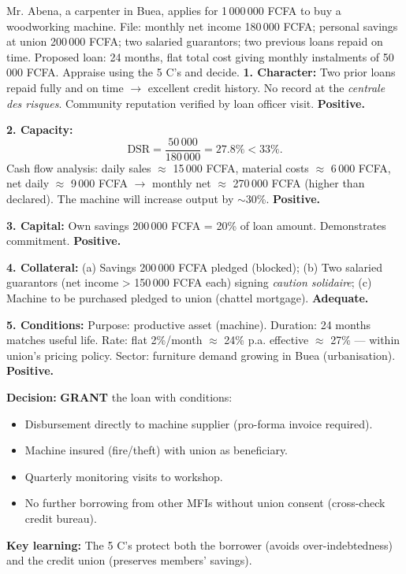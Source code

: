 \documentclass[11pt]{article}
\begin{document}
\begin{exoresolu}
Mr. Abena, a carpenter in Buea, applies for 1\,000\,000 FCFA to buy a woodworking machine. File: monthly net income 180\,000 FCFA; personal savings at union 200\,000 FCFA; two salaried guarantors; two previous loans repaid on time. Proposed loan: 24 months, flat total cost giving monthly instalments of 50\,000 FCFA. Appraise using the 5 C's and decide.
\tcblower
\textbf{1. Character:} Two prior loans repaid fully and on time $\rightarrow$ excellent credit history. No record at the \emph{centrale des risques}. Community reputation verified by loan officer visit. \textbf{Positive.}

\textbf{2. Capacity:}
\[
\text{DSR} = \frac{50\,000}{180\,000} = 27.8\% < 33\%.
\]
Cash flow analysis: daily sales $\approx$ 15\,000 FCFA, material costs $\approx$ 6\,000 FCFA, net daily $\approx$ 9\,000 FCFA $\rightarrow$ monthly net $\approx$ 270\,000 FCFA (higher than declared). The machine will increase output by $\sim$30\%. \textbf{Positive.}

\textbf{3. Capital:} Own savings 200\,000 FCFA = 20\% of loan amount. Demonstrates commitment. \textbf{Positive.}

\textbf{4. Collateral:} (a) Savings 200\,000 FCFA pledged (blocked); (b) Two salaried guarantors (net income > 150\,000 FCFA each) signing \emph{caution solidaire}; (c) Machine to be purchased pledged to union (chattel mortgage). \textbf{Adequate.}

\textbf{5. Conditions:} Purpose: productive asset (machine). Duration: 24 months matches useful life. Rate: flat 2\%/month $\approx$ 24\% p.a. effective $\approx$ 27\% — within union's pricing policy. Sector: furniture demand growing in Buea (urbanisation). \textbf{Positive.}

\textbf{Decision:} \textbf{GRANT} the loan with conditions:
\begin{itemize}
\item Disbursement directly to machine supplier (pro-forma invoice required).
\item Machine insured (fire/theft) with union as beneficiary.
\item Quarterly monitoring visits to workshop.
\item No further borrowing from other MFIs without union consent (cross-check credit bureau).
\end{itemize}
\textbf{Key learning:} The 5 C's protect both the borrower (avoids over-indebtedness) and the credit union (preserves members' savings).
\end{exoresolu}
\end{document}
